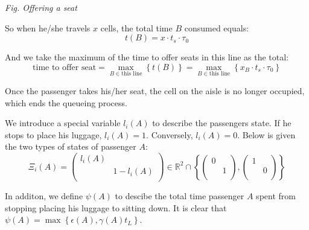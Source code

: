 \documentclass{article}
\theoremstyle{definition}
\theoremstyle{remark}
\numberwithin{equation}{section}
\begin{document}
\begin{itemize}
\begin{center}
		\small\textit{Fig. Offering a seat}
		\end{center}

		So when he/she travels $x$ cells, the total time \(B\) consumed equals:
		$$t(B)=x\cdot t_s \cdot \tau_0$$

		And we take the maximum of the time to offer seats in this line as the total:
		\[\text{time to offer seat}=\max\limits_{B\in \text{this line}}\left\{t(B)\right\} = \max\limits_{B\in \text{this line}}\left\{x_{B}\cdot t_s \cdot \tau_0\right\}\]

		Once the passenger takes his/her seat, the cell on the aisle is no longer occupied, which ends the queueing process.
	\end{itemize}
	We introduce a special variable $l_i(A)$ to describe the passengers state. If he stops to place his luggage, \(l_i(A)=1\). Conversely, \(l_i(A)=0\). Below is given the two types of states of passenger \(A\):
	\[\Xi_i\left(A\right)=\left( \begin{matrix}
	l_i\left( A \right)&		\\
	&		1-l_i\left( A \right)\\
	\end{matrix} \right) \in \mathbb{R}^2\cap \left\{ \left( \begin{matrix}
	0&		\\
	&		1\\
	\end{matrix} \right) ,\left( \begin{matrix}
	1&		\\
	&		0\\
	\end{matrix} \right) \right\}\]

	In additon, we define $\psi(A)$ to descibe the total time passenger $A$ spent from stopping placing his luggage to sitting down. It is clear that $\psi \left( A \right) =\max \left\{ \epsilon \left( A \right) ,\gamma \left( A \right) t_L \right\}$.
\end{document}
